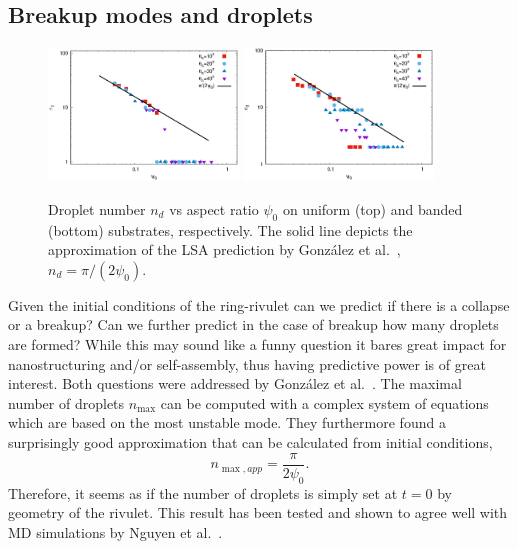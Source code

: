 \documentclass[twoside,twocolumn,9pt]{article}
\begin{document}
\subsection{Breakup modes and droplets}\label{subsec:drop-counting}

\begin{figure}
    \centering
    \includegraphics[width=0.45\textwidth]{n_drops_vs_psi_uniform.eps}
    \includegraphics[width=0.45\textwidth]{n_drops_vs_psi_pattern.eps}    
    \caption{Droplet number $n_d$ vs aspect ratio $\psi_0$ on uniform (top) and 
    banded (bottom) substrates, respectively. The solid line depicts the 
    approximation of the LSA prediction by Gonz{\'a}lez et al.~\cite{gonzalezStabilityLiquidRing2013}, $n_d = \pi/(2\psi_0)$.}
    \label{fig:max_drops}
\end{figure}

Given the initial conditions of the ring-rivulet can we predict if there is a collapse or a breakup? 
Can we further predict in the case of breakup how many droplets are formed?
While this may sound like a funny question it bares great impact for nanostructuring and/or self-assembly, thus having predictive power is of great interest.
Both questions were addressed by Gonz{\'a}lez et al.~\cite{gonzalezStabilityLiquidRing2013}. 
The maximal number of droplets $n_{\max}$ can be computed with a complex system of equations which are based on the most unstable mode.
They furthermore found a surprisingly good approximation that can be calculated from initial conditions, 
\begin{equation}\label{eq:maxDrops}
    n_{\max, app} = \frac{\pi}{2\psi_0}.
\end{equation}
Therefore, it seems as if the number of droplets is simply set at $t=0$ by geometry of the rivulet.
This result has been tested and shown to agree well with MD simulations by Nguyen et al.~\cite{nguyenCompetitionCollapseBreakup2012}. 
\end{document}
